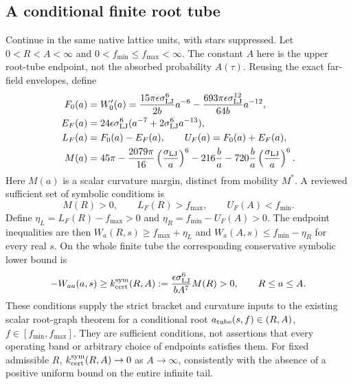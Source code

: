 \documentclass[11pt]{article}
\begin{document}
\subsection{A conditional finite root tube}
Continue in the same native lattice units, with stars suppressed.
Let $0<R<A<\infty$ and $0<f_{\min}\leq f_{\max}<\infty$.
The constant $A$ here is the upper root-tube endpoint, not the absorbed
probability $A(\tau)$. Reusing the exact far-field envelopes, define
\begin{align}
 F_0(a)&=W_0'(a)
 =\frac{15\pi\epsilon\sigma_{\rm LJ}^6}{2b}a^{-6}
 -\frac{693\pi\epsilon\sigma_{\rm LJ}^{12}}{64b}a^{-12},\\
 E_F(a)&=24\epsilon\sigma_{\rm LJ}^6
 (a^{-7}+2\sigma_{\rm LJ}^6a^{-13}),\\
 L_F(a)&=F_0(a)-E_F(a),\qquad U_F(a)=F_0(a)+E_F(a),\\
 M(a)&=45\pi-\frac{2079\pi}{16}\left(\frac{\sigma_{\rm LJ}}a\right)^6
 -216\frac ba-720\frac ba\left(\frac{\sigma_{\rm LJ}}a\right)^6 .
\end{align}
Here $M(a)$ is a scalar curvature margin, distinct from mobility $M^*$.
A reviewed sufficient set of symbolic conditions is
\begin{equation}
 M(R)>0,\qquad L_F(R)>f_{\max},\qquad U_F(A)<f_{\min}.
 \label{eq:finite-tube-conditions}
\end{equation}
Define $\eta_L=L_F(R)-f_{\max}>0$ and
$\eta_R=f_{\min}-U_F(A)>0$. The endpoint inequalities are then
$W_a(R,s)\geq f_{\max}+\eta_L$ and
$W_a(A,s)\leq f_{\min}-\eta_R$ for every real $s$.
On the whole finite tube the corresponding conservative symbolic lower bound is
\begin{equation}
 -W_{aa}(a,s)\geq k_{\rm cert}^{\rm sym}(R,A)
 :=\frac{\epsilon\sigma_{\rm LJ}^6}{bA^7}M(R)>0,
 \qquad R\leq a\leq A .
 \label{eq:finite-tube-curvature}
\end{equation}
These conditions supply the strict bracket and curvature inputs to the
existing scalar root-graph theorem for a conditional root
$a_{\rm tube}(s,f)\in(R,A)$, $f\in[f_{\min},f_{\max}]$.
They are sufficient conditions, not assertions that every operating band
or arbitrary choice of endpoints satisfies them.
For fixed admissible $R$, $k_{\rm cert}^{\rm sym}(R,A)\to0$ as
$A\to\infty$, consistently with the absence of a positive uniform bound
on the entire infinite tail.
\end{document}
